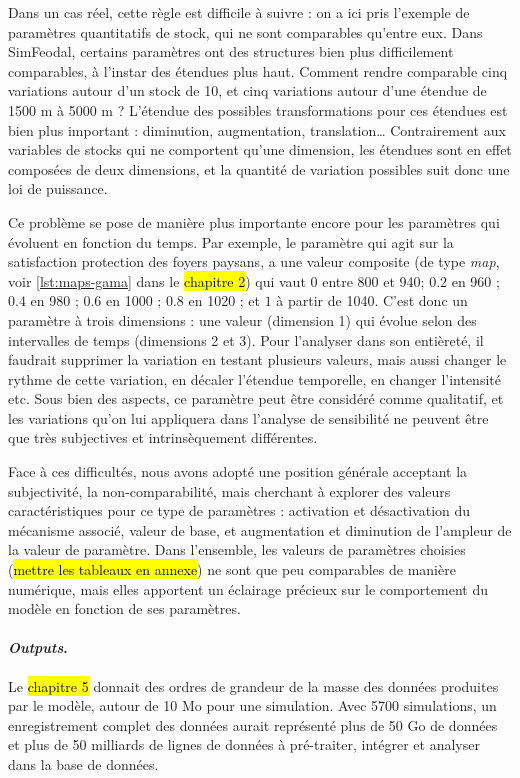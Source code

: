 Dans un cas réel, cette règle est difficile à suivre : on a ici pris l'exemple de paramètres quantitatifs \og de stock\fg{}, qui ne sont comparables qu'entre eux.
Dans SimFeodal, certains paramètres ont des structures bien plus difficilement comparables, à l'instar des étendues plus haut.
Comment rendre comparable cinq variations autour d'un stock de 10, et cinq variations autour d'une étendue de 1500 m à 5000 m ?
L'étendue des possibles transformations pour ces étendues est bien plus important : diminution, augmentation, translation\ldots{}
Contrairement aux variables de stocks qui ne comportent qu'une dimension, les étendues sont en effet composées de deux dimensions, et la quantité de variation possibles suit donc une loi de puissance.

Ce problème se pose de manière plus importante encore pour les paramètres qui évoluent en fonction du temps.
Par exemple, le paramètre qui agit sur la satisfaction protection des foyers paysans, a une valeur composite (de type \textit{map}, voir \cref{lst:maps-gama} dans le \hl{chapitre 2}) qui vaut \og $0$ entre 800 et 940; $0.2$ en 960 ; $0.4$ en 980 ; $0.6$ en 1000 ; $0.8$ en 1020 ; et $1$ à partir de 1040\fg{}.
C'est donc un paramètre à trois dimensions : une valeur (dimension 1) qui évolue selon des intervalles de temps (dimensions 2 et 3).
Pour l'analyser dans son entièreté, il faudrait supprimer la variation en testant plusieurs valeurs, mais aussi changer le rythme de cette variation, en décaler l'étendue temporelle, en changer l'intensité etc.
Sous bien des aspects, ce paramètre peut être considéré comme qualitatif, et les variations qu'on lui appliquera dans l'analyse de sensibilité ne peuvent être que très subjectives et intrinsèquement différentes.

Face à ces difficultés, nous avons adopté une position générale acceptant la subjectivité, la non-comparabilité, mais cherchant à explorer des valeurs \og caractéristiques\fg{} pour ce type de paramètres : activation et désactivation du mécanisme associé, valeur de base, et augmentation et diminution de l'ampleur de la valeur de paramètre.
Dans l'ensemble, les valeurs de paramètres choisies (\hl{mettre les tableaux en annexe}) ne sont que peu comparables de manière numérique, mais elles apportent un éclairage précieux sur le comportement du modèle en fonction de ses paramètres.

\paragraph{\textit{Outputs}.}
Le \hl{chapitre 5} donnait des ordres de grandeur de la masse des données produites par le modèle, autour de 10 Mo pour une simulation.
Avec 5700 simulations, un enregistrement complet des données aurait représenté plus de 50 Go de données et plus de 50 milliards de lignes de données à pré-traiter, intégrer et analyser dans la base de données.

